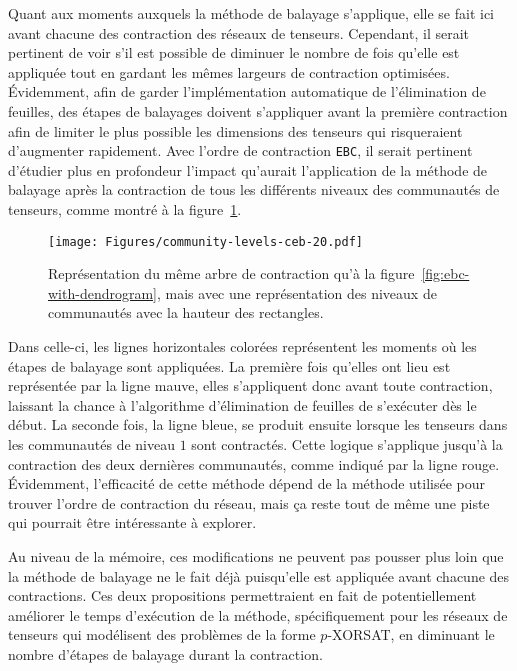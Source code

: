 Quant aux moments auxquels la méthode de balayage s'applique, elle se fait ici avant chacune des contraction des réseaux de tenseurs.
Cependant, il serait pertinent de voir s'il est possible de diminuer le nombre de fois qu'elle est appliquée tout en gardant les mêmes largeurs de contraction optimisées.
Évidemment, afin de garder l'implémentation automatique de l'élimination de feuilles, des étapes de balayages doivent s'appliquer avant la première contraction afin de limiter le plus possible les dimensions des tenseurs qui risqueraient d'augmenter rapidement.
Avec l'ordre de contraction \verb|EBC|, il serait pertinent d'étudier plus en profondeur l'impact qu'aurait l'application de la méthode de balayage après la contraction de tous les différents niveaux des communautés de tenseurs, comme montré à la figure~\ref{fig:less-sweeping-steps-ceb}.
\begin{figure}[h]
    \centering
    \texttt{[image: Figures/community-levels-ceb-20.pdf]}
    \caption[Représentation du même arbre de contraction qu'à la figure~\ref{fig:ebc-with-dendrogram}, mais avec une représentation des niveaux de communautés.]{Représentation du même arbre de contraction qu'à la figure~\ref{fig:ebc-with-dendrogram}, mais avec une représentation des niveaux de communautés avec la hauteur des rectangles.}
    \label{fig:less-sweeping-steps-ceb}
\end{figure}
Dans celle-ci, les lignes horizontales colorées représentent les moments où les étapes de balayage sont appliquées.
La première fois qu'elles ont lieu est représentée par la ligne mauve, elles s'appliquent donc avant toute contraction, laissant la chance à l'algorithme d'élimination de feuilles de s'exécuter dès le début.
La seconde fois, la ligne bleue, se produit ensuite lorsque les tenseurs dans les communautés de niveau $1$ sont contractés.
Cette logique s'applique jusqu'à la contraction des deux dernières communautés, comme indiqué par la ligne rouge.
Évidemment, l'efficacité de cette méthode dépend de la méthode utilisée pour trouver l'ordre de contraction du réseau, mais ça reste tout de même une piste qui pourrait être intéressante à explorer.

Au niveau de la mémoire, ces modifications ne peuvent pas pousser plus loin que la méthode de balayage ne le fait déjà puisqu'elle est appliquée avant chacune des contractions.
Ces deux propositions permettraient en fait de potentiellement améliorer le temps d'exécution de la méthode, spécifiquement pour les réseaux de tenseurs qui modélisent des problèmes de la forme $p$-XORSAT, en diminuant le nombre d'étapes de balayage durant la contraction.
